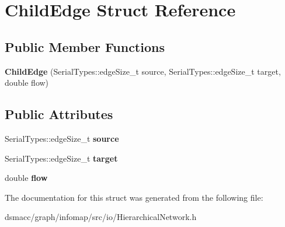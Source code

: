 \hypertarget{structChildEdge}{}\section{Child\+Edge Struct Reference}
\label{structChildEdge}
\subsection*{Public Member Functions}
\begin{DoxyCompactItemize}
\item 
\mbox{\label{structChildEdge_abc934769cdb0fe97fba68dfd49188bcb}} 
{\bfseries Child\+Edge} (Serial\+Types\+::edge\+Size\+\_\+t source, Serial\+Types\+::edge\+Size\+\_\+t target, double flow)
\end{DoxyCompactItemize}
\subsection*{Public Attributes}
\begin{DoxyCompactItemize}
\item 
\mbox{\label{structChildEdge_a96fa1f41de22833f9e8f8c8f390d18ee}} 
Serial\+Types\+::edge\+Size\+\_\+t {\bfseries source}
\item 
\mbox{\label{structChildEdge_a3bdb59f61b5759b31f4abd6ee5e8a9a0}} 
Serial\+Types\+::edge\+Size\+\_\+t {\bfseries target}
\item 
\mbox{\label{structChildEdge_a34bfdde5ad3aa5ee1ea0fa164d2ab4bc}} 
double {\bfseries flow}
\end{DoxyCompactItemize}


The documentation for this struct was generated from the following file\+:\begin{DoxyCompactItemize}
\item 
dsmacc/graph/infomap/src/io/Hierarchical\+Network.\+h\end{DoxyCompactItemize}
